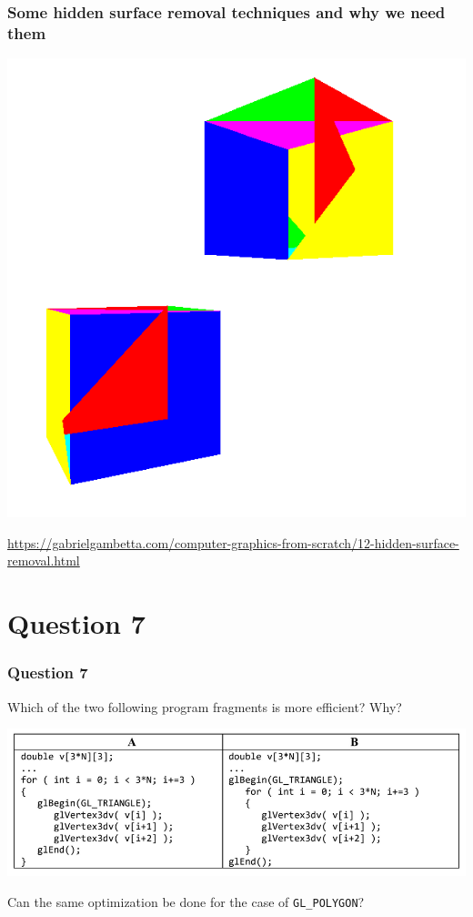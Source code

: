 \documentclass{beamer}
\begin{document}
\begin{frame}
    \frametitle{Some hidden surface removal techniques and why we need them}

    \begin{center}
        \includegraphics[scale=0.2]{hsr.png}
    \end{center}

    {\small
        \url{https://gabrielgambetta.com/computer-graphics-from-scratch/12-hidden-surface-removal.html}
    }

\end{frame}

\section{Question 7}

\begin{frame}
    \frametitle{Question 7}
    Which of the two following program fragments is more efficient? Why?

    \begin{center}
        \includegraphics[scale=0.6]{q7.png}
    \end{center}

    Can the same optimization be done for the case of \texttt{GL\_POLYGON}?
\end{frame}
\end{document}
